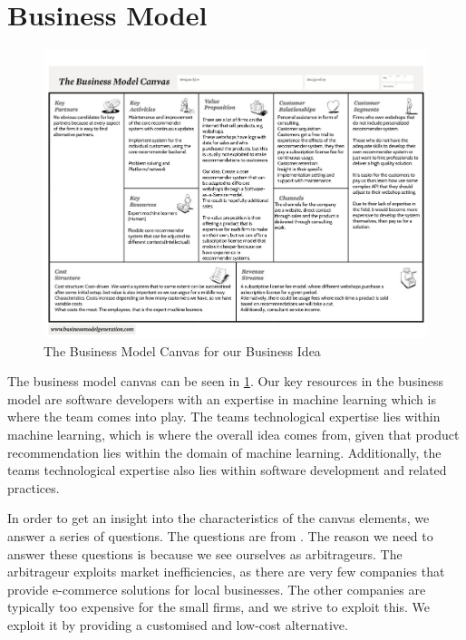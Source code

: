 \section{Business Model}
\begin{figure}
	\centering
	\includegraphics[width = 1.5\textwidth, angle=90]{figures/business-model-canvas}
	\caption{The Business Model Canvas for our Business Idea}
	\label{fig:BusinessModelCanvas}
\end{figure}

The business model canvas can be seen in \cref{fig:BusinessModelCanvas}.
Our key resources in the business model are software developers with an expertise in machine learning which is where the team comes into play. %
The teams technological expertise lies within machine learning, which is where the overall idea comes from, given that product recommendation lies within the domain of machine learning.
Additionally, the teams technological expertise also lies within software development and related practices.

In order to get an insight into the characteristics of the canvas elements, we answer a series of questions. 
The questions are from \citet[pg. 40-55]{book:jrose}.
The reason we need to answer these questions is because we see ourselves as arbitrageurs.
The arbitrageur exploits market inefficiencies, as there are very few companies that provide e-commerce solutions for local businesses. 
The other companies are typically too expensive for the small firms, and we strive to exploit this.
We exploit it by providing a customised and low-cost alternative.

